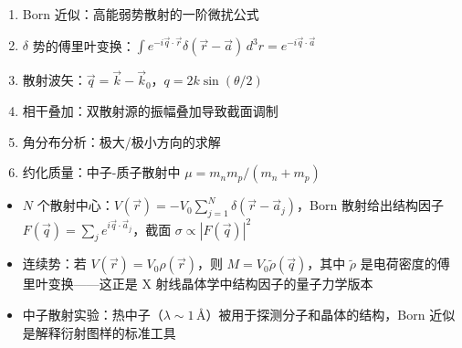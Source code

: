 \begin{derivationbox}[考察的完整知识点]
\begin{enumerate}
    \item Born 近似：高能弱势散射的一阶微扰公式
    \item $\delta$ 势的傅里叶变换：$\int e^{-i\vec{q}\cdot\vec{r}} \delta(\vec{r} - \vec{a}) \, d^3r = e^{-i\vec{q}\cdot\vec{a}}$
    \item 散射波矢：$\vec{q} = \vec{k} - \vec{k}_0$，$q = 2k\sin(\theta/2)$
    \item 相干叠加：双散射源的振幅叠加导致截面调制
    \item 角分布分析：极大/极小方向的求解
    \item 约化质量：中子-质子散射中 $\mu = m_n m_p/(m_n + m_p)$
\end{enumerate}
\end{derivationbox}

\begin{derivationbox}[拓展延伸]
\begin{itemize}
    \item $N$ 个散射中心：$V(\vec{r}) = -V_0 \sum_{j=1}^N \delta(\vec{r} - \vec{a}_j)$，Born 散射给出结构因子 $F(\vec{q}) = \sum_j e^{i\vec{q}\cdot\vec{a}_j}$，截面 $\sigma \propto |F(\vec{q})|^2$
    \item 连续势：若 $V(\vec{r}) = V_0 \rho(\vec{r})$，则 $M = V_0 \tilde{\rho}(\vec{q})$，其中 $\tilde{\rho}$ 是电荷密度的傅里叶变换——这正是 X 射线晶体学中结构因子的量子力学版本
    \item 中子散射实验：热中子（$\lambda \sim 1\,\text{\AA}$）被用于探测分子和晶体的结构，Born 近似是解释衍射图样的标准工具
\end{itemize}
\end{derivationbox}

